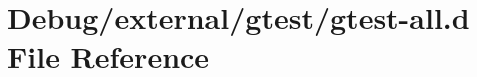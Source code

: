 \hypertarget{gtest-all_8d}{}\section{Debug/external/gtest/gtest-\/all.d File Reference}
\label{gtest-all_8d}
